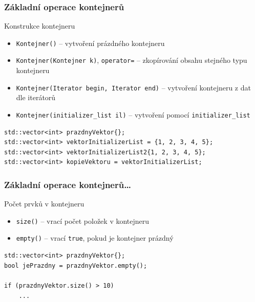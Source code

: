\begin{frame}[fragile]
\frametitle{Základní operace kontejnerů}

\begin{block}{Konstrukce kontejneru}
\begin{itemize}
\item \lstinline|Kontejner()| -- vytvoření prázdného kontejneru
\item \lstinline|Kontejner(Kontejner k)|, \lstinline|operator=| -- zkopírování obsahu stejného typu kontejneru
\item \lstinline|Kontejner(Iterator begin, Iterator end)| -- vytvoření kontejneru z dat dle iterátorů
\item \lstinline|Kontejner(initializer_list il)| -- vytvoření pomocí \lstinline|initializer_list|
\end{itemize}
\end{block}

\begin{yesblock}
\begin{lstlisting}
std::vector<int> prazdnyVektor{};
std::vector<int> vektorInitializerList = {1, 2, 3, 4, 5};
std::vector<int> vektorInitializerList2{1, 2, 3, 4, 5};
std::vector<int> kopieVektoru = vektorInitializerList;
\end{lstlisting}
\end{yesblock}
\end{frame}




\begin{frame}[fragile]
\frametitle{Základní operace kontejnerů\ldots}

\begin{block}{Počet prvků v kontejneru}
\begin{itemize}
\item \lstinline|size()| -- vrací počet položek v kontejneru
\item \lstinline|empty()| -- vrací \lstinline|true|, pokud je kontejner prázdný
\end{itemize}
\end{block}

\begin{yesblock}
\begin{lstlisting}
std::vector<int> prazdnyVektor{};
bool jePrazdny = prazdnyVektor.empty();

if (prazdnyVektor.size() > 10)
	...
\end{lstlisting}
\end{yesblock}
\end{frame}





